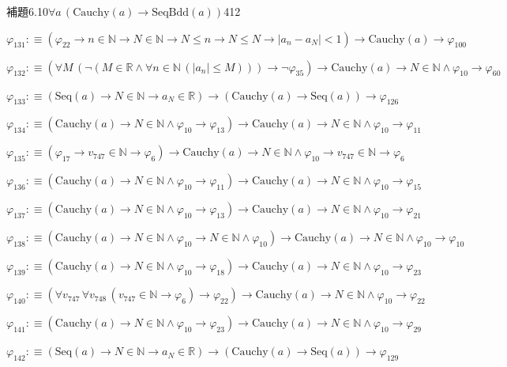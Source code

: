 \begin{fullproof}{補題6.10}{$\forall a\,(\mathrm{Cauchy}(a) \to \mathrm{SeqBdd}(a))$}{412}
\begin{abbrevlist}
\item $\varphi_{131} :\equiv (\varphi_{22} \to n \in \mathbb{N} \to N \in \mathbb{N} \to N \leq n \to N \leq N \to \lvert a_{n} - a_{N} \rvert < 1) \to \mathrm{Cauchy}(a) \to \varphi_{100}$
\item $\varphi_{132} :\equiv (\forall M\,(\neg (M \in \mathbb{R} \land \forall n \in \mathbb{N}\,(\lvert a_{n} \rvert \leq M))) \to \neg \varphi_{35}) \to \mathrm{Cauchy}(a) \to N \in \mathbb{N} \land \varphi_{10} \to \varphi_{60}$
\item $\varphi_{133} :\equiv (\mathrm{Seq}(a) \to N \in \mathbb{N} \to a_{N} \in \mathbb{R}) \to (\mathrm{Cauchy}(a) \to \mathrm{Seq}(a)) \to \varphi_{126}$
\item $\varphi_{134} :\equiv (\mathrm{Cauchy}(a) \to N \in \mathbb{N} \land \varphi_{10} \to \varphi_{13}) \to \mathrm{Cauchy}(a) \to N \in \mathbb{N} \land \varphi_{10} \to \varphi_{11}$
\item $\varphi_{135} :\equiv (\varphi_{17} \to v_{747} \in \mathbb{N} \to \varphi_{6}) \to \mathrm{Cauchy}(a) \to N \in \mathbb{N} \land \varphi_{10} \to v_{747} \in \mathbb{N} \to \varphi_{6}$
\item $\varphi_{136} :\equiv (\mathrm{Cauchy}(a) \to N \in \mathbb{N} \land \varphi_{10} \to \varphi_{11}) \to \mathrm{Cauchy}(a) \to N \in \mathbb{N} \land \varphi_{10} \to \varphi_{15}$
\item $\varphi_{137} :\equiv (\mathrm{Cauchy}(a) \to N \in \mathbb{N} \land \varphi_{10} \to \varphi_{13}) \to \mathrm{Cauchy}(a) \to N \in \mathbb{N} \land \varphi_{10} \to \varphi_{21}$
\item $\varphi_{138} :\equiv (\mathrm{Cauchy}(a) \to N \in \mathbb{N} \land \varphi_{10} \to N \in \mathbb{N} \land \varphi_{10}) \to \mathrm{Cauchy}(a) \to N \in \mathbb{N} \land \varphi_{10} \to \varphi_{10}$
\item $\varphi_{139} :\equiv (\mathrm{Cauchy}(a) \to N \in \mathbb{N} \land \varphi_{10} \to \varphi_{18}) \to \mathrm{Cauchy}(a) \to N \in \mathbb{N} \land \varphi_{10} \to \varphi_{23}$
\item $\varphi_{140} :\equiv (\forall v_{747}\,\forall v_{748}\,(v_{747} \in \mathbb{N} \to \varphi_{6}) \to \varphi_{22}) \to \mathrm{Cauchy}(a) \to N \in \mathbb{N} \land \varphi_{10} \to \varphi_{22}$
\item $\varphi_{141} :\equiv (\mathrm{Cauchy}(a) \to N \in \mathbb{N} \land \varphi_{10} \to \varphi_{23}) \to \mathrm{Cauchy}(a) \to N \in \mathbb{N} \land \varphi_{10} \to \varphi_{29}$
\item $\varphi_{142} :\equiv (\mathrm{Seq}(a) \to N \in \mathbb{N} \to a_{N} \in \mathbb{R}) \to (\mathrm{Cauchy}(a) \to \mathrm{Seq}(a)) \to \varphi_{129}$

\end{abbrevlist}
\end{fullproof}
